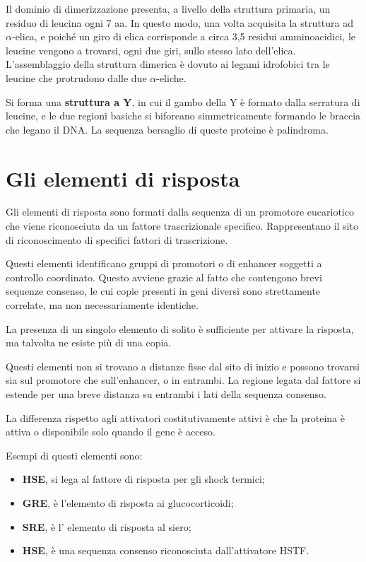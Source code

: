 \documentclass[11pt]{book}
\begin{document}
Il dominio di dimerizzazione presenta, a livello della struttura
primaria, un residuo di leucina ogni 7 aa. In questo modo, una volta
acquisita la struttura ad \(\alpha\)-elica, e poiché un giro di elica
corrisponde a circa 3,5 residui amminoacidici, le leucine vengono a
trovarsi, ogni due giri, sullo stesso lato dell'elica. L'assemblaggio
della struttura dimerica è dovuto ai legami idrofobici tra le leucine
che protrudono dalle due \(\alpha\)-eliche.

Si forma una \textbf{struttura a Y}, in cui il gambo della Y è formato
dalla serratura di leucine, e le due regioni basiche si biforcano
simmetricamente formando le braccia che legano il DNA. La sequenza
bersaglio di queste proteine è palindroma.

\section{Gli elementi di risposta}\label{gli-elementi-di-risposta}

Gli elementi di risposta sono formati dalla sequenza di un promotore
eucariotico che viene riconosciuta da un fattore trascrizionale
specifico. Rappresentano il sito di riconoscimento di specifici fattori
di trascrizione.

Questi elementi identificano gruppi di promotori o di enhancer soggetti
a controllo coordinato. Questo avviene grazie al fatto che contengono
brevi sequenze consenso, le cui copie presenti in geni diversi sono
strettamente correlate, ma non necessariamente identiche.

La presenza di un singolo elemento di solito è sufficiente per attivare
la risposta, ma talvolta ne esiste più di una copia.

Questi elementi non si trovano a distanze fisse dal sito di inizio e
possono trovarsi sia sul promotore che sull'enhancer, o in entrambi. La
regione legata dal fattore si estende per una breve distanza su entrambi
i lati della sequenza consenso.

La differenza rispetto agli attivatori costitutivamente attivi è che la
proteina è attiva o disponibile solo quando il gene è acceso.

Esempi di questi elementi sono:

\begin{itemize}
\itemsep1pt\parskip0pt
\item
  \textbf{HSE}, si lega al fattore di risposta per gli shock termici;
\item
  \textbf{GRE}, è l'elemento di risposta ai glucocorticoidi;
\item
  \textbf{SRE}, è l' elemento di risposta al siero;
\item
  \textbf{HSE}, è una sequenza consenso riconosciuta dall'attivatore
  HSTF.
\end{itemize}
\end{document}
